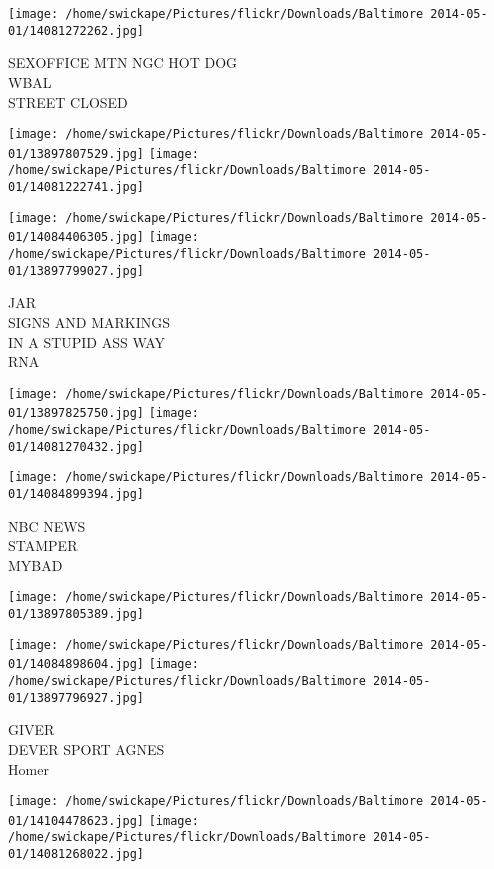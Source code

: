 \documentclass[10pt,letterpaper]{article}
\begin{document}
\vspace{0.25in}
\texttt{[image: /home/swickape/Pictures/flickr/Downloads/Baltimore 2014-05-01/14081272262.jpg]}

SEXOFFICE MTN NGC HOT DOG\\
WBAL\\
STREET CLOSED
\pagebreak

\texttt{[image: /home/swickape/Pictures/flickr/Downloads/Baltimore 2014-05-01/13897807529.jpg]}
\texttt{[image: /home/swickape/Pictures/flickr/Downloads/Baltimore 2014-05-01/14081222741.jpg]}

\texttt{[image: /home/swickape/Pictures/flickr/Downloads/Baltimore 2014-05-01/14084406305.jpg]}
\texttt{[image: /home/swickape/Pictures/flickr/Downloads/Baltimore 2014-05-01/13897799027.jpg]}

JAR\\
SIGNS AND MARKINGS\\
IN A STUPID ASS WAY\\
RNA
\pagebreak

\texttt{[image: /home/swickape/Pictures/flickr/Downloads/Baltimore 2014-05-01/13897825750.jpg]}
\texttt{[image: /home/swickape/Pictures/flickr/Downloads/Baltimore 2014-05-01/14081270432.jpg]}

\texttt{[image: /home/swickape/Pictures/flickr/Downloads/Baltimore 2014-05-01/14084899394.jpg]}

NBC NEWS\\
STAMPER\\
MYBAD
\pagebreak

\texttt{[image: /home/swickape/Pictures/flickr/Downloads/Baltimore 2014-05-01/13897805389.jpg]}

\vspace{0.25in}
\texttt{[image: /home/swickape/Pictures/flickr/Downloads/Baltimore 2014-05-01/14084898604.jpg]}
\texttt{[image: /home/swickape/Pictures/flickr/Downloads/Baltimore 2014-05-01/13897796927.jpg]}

GIVER\\
DEVER SPORT AGNES\\
Homer
\pagebreak

\texttt{[image: /home/swickape/Pictures/flickr/Downloads/Baltimore 2014-05-01/14104478623.jpg]}
\texttt{[image: /home/swickape/Pictures/flickr/Downloads/Baltimore 2014-05-01/14081268022.jpg]}
\end{document}
